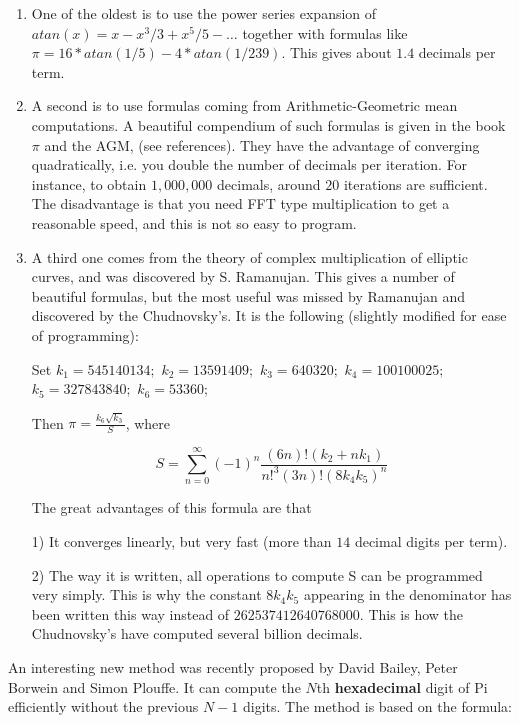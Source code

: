 \begin{enumerate}

     \item One of the oldest is to use the power series expansion of
     $atan(x)=x-x^3/3+x^5/5-\ldots$ together with formulas like
     $\pi=16*atan(1/5)-4*atan(1/239)$. This gives about $1.4$ decimals per term.

     \item A second is to use formulas coming from Arithmetic-Geometric mean
     computations. A beautiful compendium of such formulas is given in the
     book $\pi$ and the AGM, (see references).
      They have the advantage of converging
     quadratically, i.e. you double the number of decimals per iteration.
     For instance, to obtain $1,000,000$ decimals, around $20$ iterations are
     sufficient. The disadvantage is that you need FFT type multiplication
     to get a reasonable speed, and this is not so easy to program.

     \item
     A third one comes from the theory of complex multiplication of elliptic
     curves, and was discovered by S. Ramanujan. This gives a number of
     beautiful formulas, but the most useful was missed by Ramanujan and
     discovered by the Chudnovsky's. It is the following (slightly modified
     for ease of programming):

     Set $k_1=545140134;$ $k_2=13591409;$ $k_3=640320;$ $k_4=100100025;$
     $k_5=327843840;$ $k_6=53360;$

     Then $\pi=\frac{k_6\sqrt{k_3}}{S}$, where

     $$S=\sum_{n=0}^\infty (-1)^n\frac{(6n)!(k_2+nk_1)}{n!^3(3n)!(8k_4k_5)^n}$$

     The great advantages of this formula are that

     1) It converges linearly, but very fast (more than $14$ decimal digits per
     term).

     2) The way it is written, all operations to compute S can be programmed
     very simply. This is why the constant $8k_4k_5$ appearing in the
     denominator has been written this way instead of $262537412640768000$.
     This is how the Chudnovsky's have computed several billion decimals.

\end{enumerate}


%
An interesting new method was recently proposed by David Bailey, 
Peter Borwein and 
Simon Plouffe. It can compute the $N$th  {\bf hexadecimal} digit of Pi
efficiently without the previous $N-1$ digits. The method is based
on the formula:

